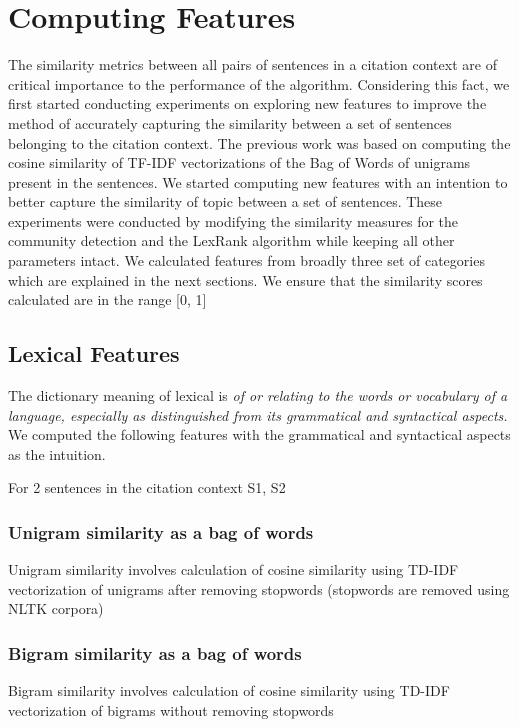 \section{Computing Features}
The similarity metrics between all pairs of sentences in a citation context are of critical importance to the performance of the algorithm. Considering this fact, we first started conducting experiments on exploring new features to improve the method of accurately capturing the similarity between a set of sentences belonging to the citation context. The previous work was based on computing the cosine similarity of TF-IDF vectorizations of the Bag of Words of unigrams present in the sentences. We started computing new features with an intention to better capture the similarity of topic between a set of sentences. These experiments were conducted by modifying the similarity measures for the community detection and the LexRank algorithm while keeping all other parameters intact. We calculated features from broadly three set of categories which are explained in the next sections. We ensure that the similarity scores calculated are in the range [0, 1]

\subsection{Lexical Features}
The dictionary meaning of lexical is \textit{of or relating to the words or vocabulary of a language, especially as distinguished from its grammatical and syntactical aspects.} We computed the following features with the grammatical and syntactical aspects as the intuition.

For 2 sentences in the citation context S1, S2

\subsubsection{Unigram similarity as a bag of words}

Unigram similarity involves calculation of cosine similarity using TD-IDF vectorization of unigrams after removing stopwords (stopwords are removed using NLTK corpora)

\subsubsection{Bigram similarity as a bag of words}
Bigram similarity involves calculation of cosine  similarity using TD-IDF vectorization of bigrams without removing stopwords

